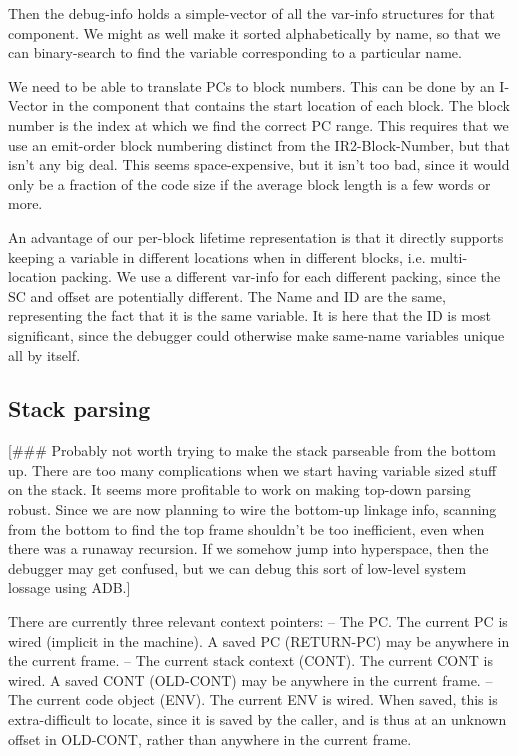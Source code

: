 Then the debug-info holds a simple-vector of all the var-info structures for
that component.  We might as well make it sorted alphabetically by name, so
that we can binary-search to find the variable corresponding to a particular
name.

We need to be able to translate PCs to block numbers.  This can be done by an
I-Vector in the component that contains the start location of each block.  The
block number is the index at which we find the correct PC range.  This requires
that we use an emit-order block numbering distinct from the IR2-Block-Number,
but that isn't any big deal.  This seems space-expensive, but it isn't too bad,
since it would only be a fraction of the code size if the average block length
is a few words or more.

An advantage of our per-block lifetime representation is that it directly
supports keeping a variable in different locations when in different blocks,
i.e. multi-location packing.  We use a different var-info for each different
packing, since the SC and offset are potentially different.  The Name and ID
are the same, representing the fact that it is the same variable.  It is here
that the ID is most significant, since the debugger could otherwise make
same-name variables unique all by itself.



\subsection{Stack parsing}

[\#\#\# Probably not worth trying to make the stack parseable from the bottom up.
There are too many complications when we start having variable sized stuff on
the stack.  It seems more profitable to work on making top-down parsing robust.
Since we are now planning to wire the bottom-up linkage info, scanning from the
bottom to find the top frame shouldn't be too inefficient, even when there was
a runaway recursion.  If we somehow jump into hyperspace, then the debugger may
get confused, but we can debug this sort of low-level system lossage using
ADB.]


There are currently three relevant context pointers:
  -- The PC.  The current PC is wired (implicit in the machine).  A saved
     PC (RETURN-PC) may be anywhere in the current frame.
  -- The current stack context (CONT).  The current CONT is wired.  A saved
     CONT (OLD-CONT) may be anywhere in the current frame.
  -- The current code object (ENV).  The current ENV is wired.  When saved,
     this is extra-difficult to locate, since it is saved by the caller, and is
     thus at an unknown offset in OLD-CONT, rather than anywhere in the current
     frame.

